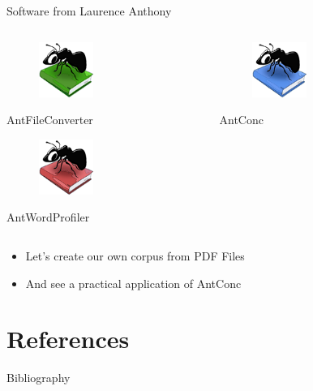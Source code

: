 \documentclass{beamer}
\begin{document}
\begin{frame}{Software from Laurence Anthony}
    \begin{columns}
        \begin{column}{6cm}
            \begin{figure}
            \includegraphics[height=1.8cm]{AntFileConverter.png}
            \end{figure}
            \begin{center}
                \tiny
                AntFileConverter \\
            \end{center}
            \begin{figure}
                \includegraphics[height=1.8cm]{AntWordProfiler.png}
            \end{figure}
            \begin{center}
                \tiny
                AntWordProfiler
            \end{center}
        \end{column}
        \begin{column}{6cm}
            \begin{flushleft}
            \begin{figure}
                \includegraphics[height=1.8cm]{AntConc.png}
            \end{figure}
            \begin{center}
            \tiny
            AntConc
            \end{center}
            \end{flushleft}
        \end{column}
    \end{columns}
\end{frame}






\begin{frame}
\begin{itemize}
\item Let's create our own corpus from PDF Files
\item And see a practical application of AntConc
\end{itemize}
\end{frame}
    
\section{References}

\begin{frame}[allowframebreaks]{Bibliography}




\end{frame}
\end{document}
